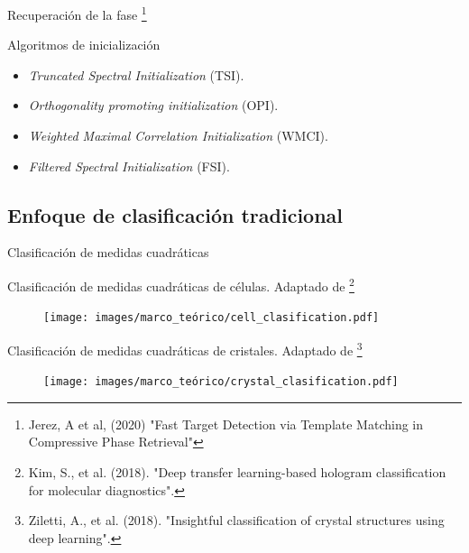 \documentclass[aspectratio=169,t,xcolor=table]{beamer}
\begin{document}
\begin{frame}{Recuperación de la fase \footnote{\tiny Jerez, A et al, (2020) "Fast Target Detection via Template Matching in Compressive Phase Retrieval"}}
{\begin{minipage}[t]{0.55\linewidth}
\begin{block}{\scriptsize Algoritmos de inicialización}
\begin{itemize}
            \item \textit{Truncated Spectral Initialization} (TSI).
            \item \textit{Orthogonality promoting initialization} (OPI).
            \item \textit{Weighted Maximal Correlation Initialization} (WMCI).
            \item \textit{Filtered Spectral Initialization} (FSI).
        \end{itemize}
    \end{block}
\end{minipage}}


\end{frame}






\subsection{Enfoque de clasificación tradicional}
\begin{frame}{Clasificación de medidas cuadráticas}
\scriptsize

Clasificación de medidas cuadráticas de células. Adaptado de \footnote{\tiny Kim, S., et al. (2018). "Deep transfer learning-based hologram classification for molecular diagnostics".} 
    \begin{figure}
        \centering
        \texttt{[image: images/marco\_teórico/cell\_clasification.pdf]}
    \end{figure}
\vspace{-0.25cm}
Clasificación de medidas cuadráticas de cristales. Adaptado de \footnote{\tiny Ziletti, A., et al. (2018). "Insightful classification of crystal structures using deep learning".}
    \begin{figure}
        \centering
        \texttt{[image: images/marco\_teórico/crystal\_clasification.pdf]}
    \end{figure}
\end{frame}
\end{document}
